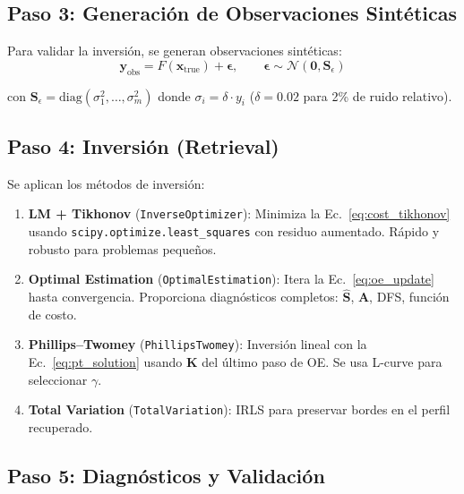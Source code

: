 \documentclass[a4paper,11pt]{article}
\begin{document}
\subsection{Paso 3: Generaci\'on de Observaciones Sint\'eticas}

Para validar la inversi\'on, se generan observaciones sint\'eticas:
\begin{equation}
    \mathbf{y}_{\text{obs}} = F(\mathbf{x}_{\text{true}})
    + \bm{\epsilon}, \qquad
    \bm{\epsilon} \sim \mathcal{N}(\mathbf{0}, \mathbf{S}_\epsilon)
\end{equation}

con $\mathbf{S}_\epsilon = \text{diag}(\sigma_1^2,\ldots,\sigma_m^2)$ donde
$\sigma_i = \delta \cdot y_i$ ($\delta = 0.02$ para 2\% de ruido relativo).

\subsection{Paso 4: Inversi\'on (Retrieval)}

Se aplican los m\'etodos de inversi\'on:

\begin{enumerate}
    \item \textbf{LM + Tikhonov} (\texttt{InverseOptimizer}):
          Minimiza la Ec.~\eqref{eq:cost_tikhonov} usando
          \texttt{scipy.optimize.least\_squares} con residuo aumentado.
          R\'apido y robusto para problemas peque\~nos.

    \item \textbf{Optimal Estimation} (\texttt{OptimalEstimation}):
          Itera la Ec.~\eqref{eq:oe_update} hasta convergencia.
          Proporciona diagn\'osticos completos: $\hat{\mathbf{S}}$,
          $\mathbf{A}$, DFS, funci\'on de costo.

    \item \textbf{Phillips--Twomey} (\texttt{PhillipsTwomey}):
          Inversi\'on lineal con la Ec.~\eqref{eq:pt_solution} usando
          $\mathbf{K}$ del \'ultimo paso de OE.  Se usa L-curve para
          seleccionar $\gamma$.

    \item \textbf{Total Variation} (\texttt{TotalVariation}):
          IRLS para preservar bordes en el perfil recuperado.
\end{enumerate}

\subsection{Paso 5: Diagn\'osticos y Validaci\'on}
\end{document}
